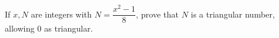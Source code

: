 If $x,N$ are integers with $N=\dfrac{x^2-1}{8}$, prove that $N$ is a triangular number, allowing $0$ as triangular.
